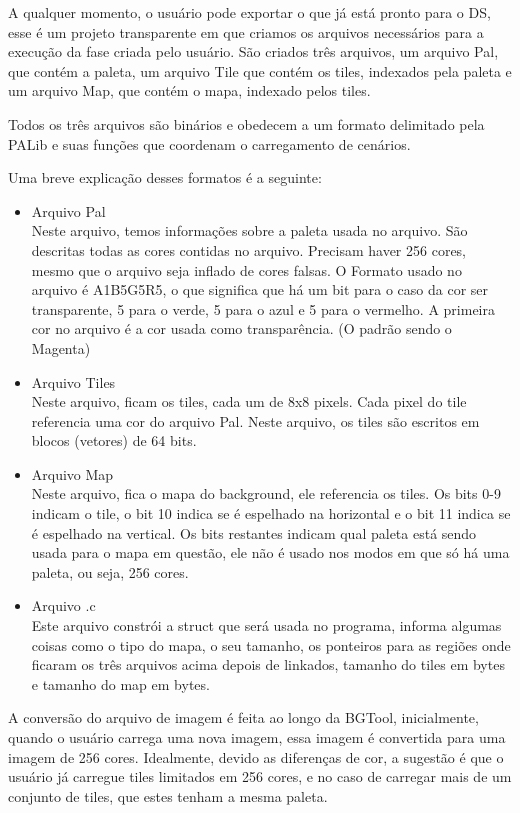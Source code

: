 \documentclass[brazil]{abnt}
\begin{document}
A qualquer momento, o usuário pode exportar o que já está pronto para o DS, esse é um projeto transparente em que criamos os arquivos necessários para a execução da fase criada pelo usuário. São criados três arquivos, um arquivo Pal, que contém a paleta, um arquivo Tile que contém os tiles, indexados pela paleta e um arquivo Map, que contém o mapa, indexado pelos tiles.

Todos os três arquivos são binários e obedecem a um formato delimitado pela PALib e suas funções que coordenam o carregamento de cenários.

Uma breve explicação desses formatos é a seguinte:

\begin{itemize}
 \item Arquivo Pal\\
 Neste arquivo, temos informações sobre a paleta usada no arquivo. São descritas todas as cores contidas no arquivo. Precisam haver 256 cores, mesmo que o arquivo seja inflado de cores falsas. O Formato usado no arquivo é A1B5G5R5, o que significa que há um bit para o caso da cor ser transparente, 5 para o verde, 5 para o azul e 5 para o vermelho. A primeira cor no arquivo é a cor usada como transparência. (O padrão sendo o Magenta)
 \item Arquivo Tiles\\
 Neste arquivo, ficam os tiles, cada um de 8x8 pixels. Cada pixel do tile referencia uma cor do arquivo Pal. Neste arquivo, os tiles são escritos em blocos (vetores) de 64 bits. 
 \item Arquivo Map\\
 Neste arquivo, fica o mapa do background, ele referencia os tiles. Os bits 0-9 indicam o tile, o bit 10 indica se é espelhado na horizontal e o bit 11 indica se é espelhado na vertical. Os bits restantes indicam qual paleta está sendo usada para o mapa em questão, ele não é usado nos modos em que só há uma paleta, ou seja, 256 cores.
 \item Arquivo .c\\
 Este arquivo constrói a struct que será usada no programa, informa algumas coisas como o tipo do mapa, o seu tamanho, os ponteiros para as regiões onde ficaram os três arquivos acima depois de linkados, tamanho do tiles em bytes e tamanho do map em bytes. 
\end{itemize}

A conversão do arquivo de imagem é feita ao longo da BGTool, inicialmente, quando o usuário carrega uma nova imagem, essa imagem é convertida para uma imagem de 256 cores. Idealmente, devido as diferenças de cor, a sugestão é que o usuário já carregue tiles limitados em 256 cores, e no caso de carregar mais de um conjunto de tiles, que estes tenham a mesma paleta.
\end{document}
